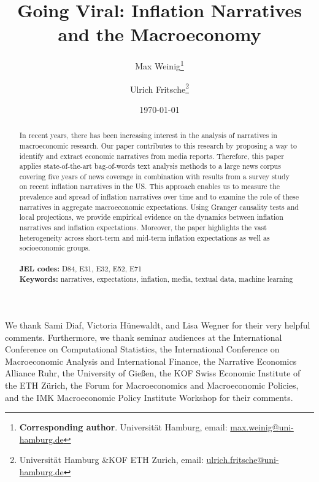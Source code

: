 \documentclass[a4paper, 12pt]{article}
\newenvironment{customabstract}
{\begin{center}\begin{minipage}{0.85\textwidth}}
		{\end{minipage}\end{center}}
\begin{document}
	

\title{Going Viral: Inflation Narratives and the Macroeconomy}
\author{Max Weinig\footnote{\textbf{Corresponding author}. Universität Hamburg, email:  \href{mailto:max.weinig@uni-hamburg.de}{max.weinig@uni-hamburg.de}} \and Ulrich Fritsche\footnote{Universität Hamburg \&KOF ETH Zurich, email: \href{mailto:ulrich.fritsche@uni-hamburg.de}{ulrich.fritsche@uni-hamburg.de}}}
\date{\today}

\maketitle

\begin{abstract}
    \noindent In recent years, there has been increasing interest in the analysis of narratives in macroeconomic research. Our paper contributes to this research by proposing a way to identify and extract economic narratives from media reports. Therefore, this paper applies state-of-the-art bag-of-words text analysis methods to a large news corpus covering five years of news coverage in combination with results from a survey study on recent inflation narratives \citep{Andre.2023} in the US. This approach enables us to measure the prevalence and spread of inflation narratives over time and to examine the role of these narratives in aggregate macroeconomic expectations. Using Granger causality tests and local projections, we provide empirical evidence on the dynamics between inflation narratives and inflation expectations. Moreover, the paper highlights the vast heterogeneity across short-term and mid-term inflation expectations as well as socioeconomic groups. \\
    \\
    \textbf{JEL codes:} D84, E31, E32, E52, E71\\
    \textbf{Keywords:} narratives, expectations, inflation, media, textual data, machine learning
\end{abstract}
\vspace{4cm}
\begin{customabstract}
 \footnotesize
	 \noindent We thank Sami Diaf, Victoria Hünewaldt, and Lisa Wegner for their very helpful comments. Furthermore, we thank seminar audiences at the International Conference on Computational Statistics, the International Conference on Macroeconomic Analysis and International Finance, the Narrative Economics Alliance Ruhr, the University of Gießen, the KOF Swiss Economic Institute of the ETH Zürich, the Forum for Macroeconomics and Macroeconomic Policies, and the IMK Macroeconomic Policy Institute Workshop for their comments. 
	
\end{customabstract}
\end{document}
